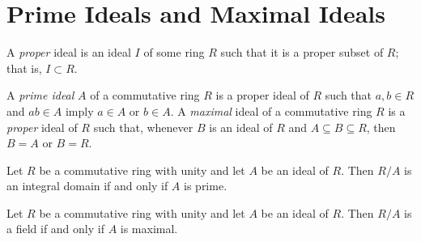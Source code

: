 \section{Prime Ideals and Maximal Ideals}

\begin{remark}
	A \textit{proper} ideal is an ideal $I$ of some ring $R$ such that it is a proper subset of $R$; that is, $I \subset R$.
\end{remark}

\begin{definition}
	A \textit{prime ideal} $A$ of a commutative ring $R$ is a proper ideal of $R$ such that $a,b \in R$ and $ab \in A$ imply $a \in A$ or $b \in A$. A \textit{maximal} ideal of a commutative ring $R$ is a \textit{proper} ideal of $R$ such that, whenever $B$ is an ideal of $R$ and $A \subseteq B \subseteq R$, then $B = A$ or $B = R$.
\end{definition}

\begin{theorem}
	Let $R$ be a commutative ring with unity and let $A$ be an ideal of $R$. Then $R/A$ is an integral domain if and only if $A$ is prime.
\end{theorem}

\begin{theorem}
	Let $R$ be a commutative ring with unity and let $A$ be an ideal of $R$. Then $R/A$ is a field if and only if $A$ is maximal.
\end{theorem}
